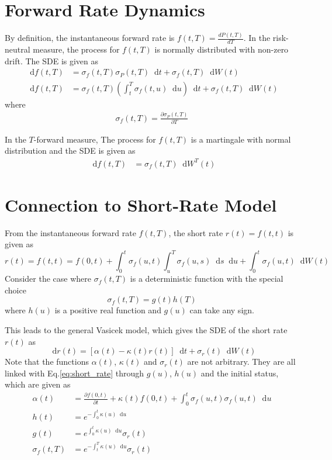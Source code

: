 \documentclass[12pt]{article}
\newcommand{\dd}{\mathop{}\!\text{d}}
\newcommand{\qBrownian}[1]{W(#1)}
\newcommand{\tBrownian}[1]{W^{T}(#1)}
\newcommand{\sigmaP}{\sigma_P}
\newcommand{\sigmaf}{\sigma_f}
\newcommand{\sigmar}{\sigma_r}
\begin{document}
\section{Forward Rate Dynamics}
By definition, the instantaneous forward rate is $f(t, T) = \frac{dP(t,T)}{dT}$.
In the risk-neutral measure, the process for $f(t,T)$ is normally distributed with
non-zero drift. The SDE is given as
\begin{align}
    \dd f(t,T) &= \sigmaf(t,T) \sigmaP(t, T) \dd t + \sigmaf(t,T)
        \dd \qBrownian{t} \\
    \dd f(t,T) &= \sigmaf(t,T) \left(\int_t^T \sigmaf(t,u) \dd u \right) \dd t + \sigmaf(t,T)
        \dd \qBrownian{t}
\end{align}
where 
\begin{align}
    \sigmaf(t,T) = \frac{\partial\sigmaP(t,T)}{\partial T}
\end{align}
    
In the $T$-forward measure, The process for $f(t,T)$ is a martingale with normal distribution
and the SDE is given as
\begin{align}
    \dd f(t,T) &= \sigmaf(t,T) \dd \tBrownian{t}
\end{align}

\section{Connection to Short-Rate Model}
From the instantaneous forward rate $f(t, T)$, the short rate $r(t) = f(t,t)$ is given as
\begin{equation}
    \label{eq:short_rate}
    r(t) = f(t,t) = f(0, t) + \int_0^t \sigmaf(u,t) \int_u^T
    \sigmaf(u,s) \dd s \dd u + \int_0^t \sigmaf(u, t) \dd \qBrownian{t}
\end{equation}
Consider the case where $\sigmaf(t,T)$ is a deterministic function with the special
choice
\begin{equation}
    \label{eq:gh}
    \sigmaf(t, T) = g(t) h(T)
\end{equation}
where $h(u)$ is a positive real function and $g(u)$ can take any sign.

This leads to the general Vasicek model, which gives the SDE of the short rate $r(t)$ as
\begin{equation}
    \dd r(t) = \left[\alpha(t) -\kappa(t)r(t)\right] \dd t + \sigmar(t) \dd \qBrownian{t}
\end{equation}
Note that the functions $\alpha(t)$, $\kappa(t)$ and $\sigmar(t)$ are not arbitrary.
They are all linked with Eq.\ref{eq:short_rate} through $g(u)$, $h(u)$ and the initial status,
which are given as
\begin{align}
    \alpha(t) &= \frac{\partial f(0, t)}{\partial t} + \kappa(t) f(0, t) +
        \int_0^t \sigmaf(u,t)\sigmaf(u,t)\dd u\\
    h(t) &= e^{-\int_0^t \kappa(u) \dd u} \\
    g(t) &= e^{\int_0^t \kappa(u) \dd u} \sigmar(t) \\
    \sigmaf(t, T) &= e^{-\int_t^T \kappa(u) \dd u } \sigmar(t)
\end{align}
\end{document}

